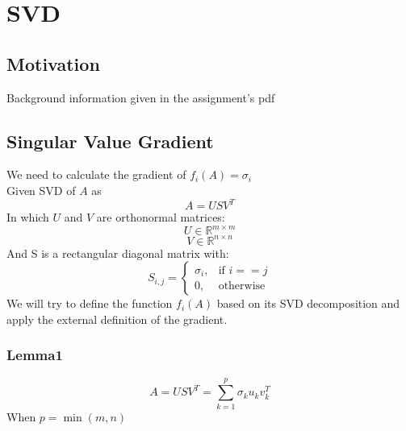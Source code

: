 \documentclass[12pt]{article}
\begin{document}
\newpage
\section{SVD}
\subsection{Motivation}
Background information given in the assignment's pdf
\subsection{Singular Value Gradient}
We need to calculate the gradient of $f_i(A) = \sigma_i$\\
Given SVD of $A$ as $$A=USV^T$$
In which $U$ and $V$ are orthonormal matrices:
$$U \in \mathbb{R}^{m\times m}$$
$$V \in \mathbb{R}^{n\times n}$$
And S is a rectangular diagonal matrix with:
\[
    S_{i,j}= 
\begin{cases}
    \sigma_i,& \text{if } i==j\\
    0,       & \text{otherwise}
\end{cases}
\]
We will try to define the function $f_i(A)$ based on its SVD decomposition and apply the external definition of the gradient.\\
\subsubsection*{Lemma1}
$$A=USV^T=\sum_{k=1}^p\sigma_k u_{k} v^T_{k}$$ When $p=\min(m,n)$
\end{document}
